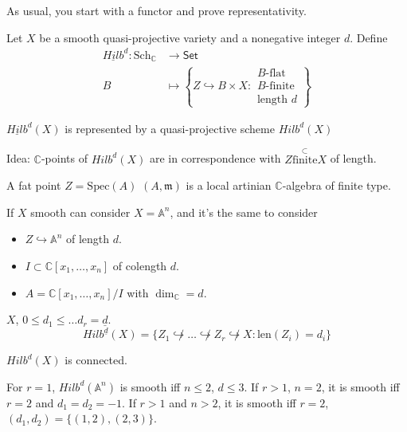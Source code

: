 {\medskip\noindent

As usual, you start with a functor and
prove representativity.

\begin{definition}
\label{definition-hilbert-scheme}
Let $X$ be a smooth
quasi-projective variety and a nonegative integer $d$.
Define
\begin{align*}
\underline{Hilb}^d: \text{Sch}_\mathbb{C} &\longrightarrow \mathsf{Set} \\
B &\longmapsto \left\{Z \hookrightarrow B \times X:
\substack{B\text{-flat} \\ B\text{-finite}\\ \text{length }d}\right\}
\end{align*}
\end{definition}

\begin{theorem}[Grothendieck]
\label{theorem-grothendieck}
$\underline{Hilb}^d(X)$ is represented by a quasi-projective
scheme $Hilb^d(X)$
\end{theorem}

Idea: $\mathbb{C}$-points of $Hilb^d(X)$
are in correspondence with $Z \overset{\subset}{\text{finite}}X$
of length.

A fat point $Z= \text{Spec}(A)$ $(A, \mathfrak{m})$ is a
local artinian $\mathbb{C}$-algebra of finite type.

If $X$ smooth can consider $X=\mathbb{A}^n$, and it's the same to consider
\begin{itemize}
\item $Z \hookrightarrow \mathbb{A}^n$ of length $d$.
\item $I \subset \mathbb{C}[x_1,\ldots,x_n]$ of 
colength $d$.
\item $A= \mathbb{C}[x_1,\ldots,x_n]/I$ with $\dim_\mathbb{C}=d$.
\end{itemize}

\begin{definition}
\label{definition-nested-Hilbert-scheme}
$X$, $0 \leq d_1 \leq \ldots d_r=\underline{d}$.
$$
Hilb^{\underline{d}}(X)=\{Z_1\not\hookrightarrow \ldots
\not\hookrightarrow Z_r  \not\hookrightarrow X:
\text{len}(Z_i)=d_i\}
$$
\end{definition}

\begin{theorem}[Hartshorne (r=0), Fogarty, Kalpan (r>1)]
\label{theorem-HK}
$Hilb^d(X)$ is connected.
\end{theorem}

For $r=1$, $Hilb^d(\mathbb{A}^n)$ is smooth iff
$n \leq 2$, $d \leq 3$.
If $r>1$, $n=2$, it is smooth iff $r=2$ and $d_1=d_2=-1$.
If $r>1$ and $n>2$, it is smooth iff $r=2$, $(d_1,d_2)=\{(1,2),(2,3)\}$.

}
